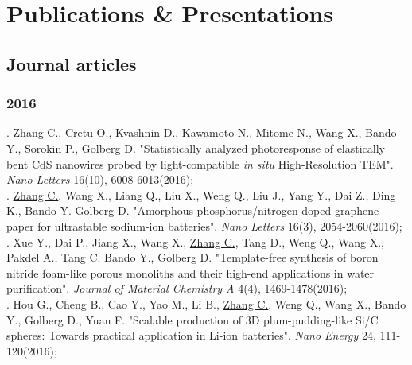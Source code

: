 
\chapter*{Publications \& Presentations}
\section*{Journal articles}
\noindent
\subsection*{2016}
. {\underline {Zhang C.}}, Cretu O., Kvashnin D., Kawamoto N., Mitome N., Wang X., Bando Y., Sorokin P., Golberg D. "Statistically analyzed photoresponse of elastically bent CdS nanowires probed by light-compatible {\em in situ} High-Resolution TEM". {\em Nano Letters} 16(10), 6008-6013(2016); \\[5pt]
. \underline{Zhang C.}, Wang X., Liang Q., Liu X., Weng Q., Liu J., Yang Y., Dai Z., Ding K., Bando Y. Golberg D. "Amorphous phosphorus/nitrogen-doped graphene paper for ultrastable sodium-ion batteries". {\em Nano Letters} 16(3), 2054-2060(2016);\\[5pt]
. Xue Y., Dai P., Jiang X., Wang X., \underline{Zhang C.}, Tang D., Weng Q., Wang X., Pakdel A., Tang C. Bando Y., Golberg D. "Template-free synthesis of boron nitride foam-like porous monoliths and their high-end applications in water purification". {\em Journal of Material Chemistry A} 4(4), 1469-1478(2016);\\[5pt]
. Hou G., Cheng B., Cao Y., Yao M., Li B., \underline{Zhang C.}, Weng Q., Wang X., Bando Y., Golberg D., Yuan F. "Scalable production of 3D plum-pudding-like Si/C spheres: Towards practical application in Li-ion batteries". {\em Nano Energy} 24, 111-120(2016); \\

